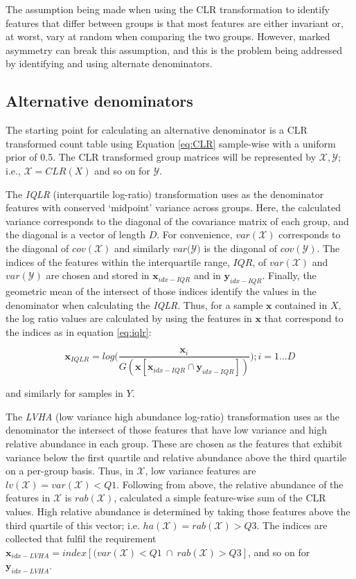 \documentclass[graybox]{svmult}
\begin{document}
The assumption being made when using the CLR transformation to identify features that differ between groups is that most features are either invariant or, at worst, vary at random when comparing the two groups. However, marked asymmetry can break this assumption, and this is the problem being addressed by identifying and using alternate denominators.

\subsection*{Alternative denominators}
\label{subsec:1.3}

The starting point for calculating an alternative denominator is a  CLR transformed  count table using Equation \ref{eq:CLR} sample-wise with a uniform prior of 0.5. The CLR transformed group matrices will be represented by $\mathcal{X,Y}$; i.e., $\mathcal{X} = CLR(X)$ and so on for $\mathcal{Y}$. 

The \textit{IQLR} (interquartile log-ratio) transformation uses as the denominator features with conserved `midpoint' variance across groups. Here, the calculated variance corresponds to the diagonal of the covariance matrix of each  group, and the diagonal is a vector of length $D$. For convenience, $var(\mathcal{X})$ corresponds to the diagonal of  $cov(\mathcal{X})$ and similarly $var(\mathcal{Y)}$ is the diagonal of  $cov(\mathcal{Y})$.   The indices of the  features within the interquartile range, $IQR$, of $var(\mathcal{X})$  and $var(\mathcal{Y})$ are chosen and stored in $\textbf{x}_{idx-IQR}$ and  in $\textbf{y}_{idx-IQR}$. Finally, the geometric mean of the intersect of those indices identify the values in the denominator when calculating the \textit{IQLR}. Thus, for a sample $\textbf{x}$ contained in  $X$, the log ratio values are calculated by using the features in $\textbf{x}$ that correspond to the indices as in equation \ref{eq:iqlr}:

\begin{equation}
\textbf{x}_{ IQLR }= log  \Big( \frac{\textbf{x}_i}{G(\textbf{x}[\textbf{x}_{idx-IQR} \cap \textbf{y}_{idx-IQR}] )}  \Big ) ;i=1 \dots D
\label{eq:iqlr}
\end{equation}

and similarly for samples in $Y$. 

The \textit{LVHA} (low variance high abundance log-ratio) transformation uses as the denominator the intersect of those features that have low variance and high relative abundance in each group. These are chosen as the features that exhibit variance below the first quartile and relative abundance above the third quartile on a per-group basis. Thus, in $\mathcal{X}$, low variance features are $lv(\mathcal{X}) = var(\mathcal{X}) < Q1$. Following from above, the relative abundance of the features in $\mathcal{X}$ is $rab(\mathcal{X})$, calculated a simple feature-wise sum of the CLR values.  High relative abundance is determined by taking those features above the third quartile of this vector; i.e. $ha(\mathcal{X}) = rab(\mathcal{X}) > Q3$. The indices are collected that fulfil the requirement $\textbf{x}_{idx-LVHA}= index [ (var(\mathcal{X}) < Q1~\cap~ rab(\mathcal{X}) > Q3]$, and so on for $\textbf{y}_{idx-LVHA}$.
\end{document}
